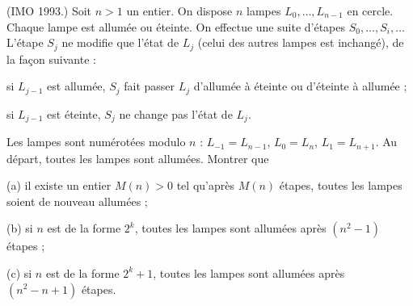 (IMO 1993.) Soit $n > 1$ un entier. On dispose $n$ lampes $L_0, \ldots, L_{n-1}$ en cercle. Chaque lampe est allumée ou éteinte. On effectue une suite d'étapes $S_0, \ldots, S_i, \ldots$ L'étape $S_j$ ne modifie que l'état de $L_j$ (celui des autres lampes est inchangé), de la façon suivante :

si $L_{j-1}$ est allumée, $S_j$ fait passer $L_j$ d'allumée à éteinte ou d'éteinte à allumée ;

si $L_{j-1}$ est éteinte, $S_j$ ne change pas l'état de $L_j$.

Les lampes sont numérotées modulo $n$ : $L_{-1} = L_{n-1}$, $L_0 = L_n$, $L_1 = L_{n+1}$. Au départ, toutes les lampes sont allumées. Montrer que

(a) il existe un entier $M(n) > 0$ tel qu'après $M(n)$ étapes, toutes les lampes soient de nouveau allumées ;

(b) si $n$ est de la forme $2^k$, toutes les lampes sont allumées après $(n^2 - 1)$ étapes ;

(c) si $n$ est de la forme $2^k + 1$, toutes les lampes sont allumées après $(n^2 - n + 1)$ étapes.
